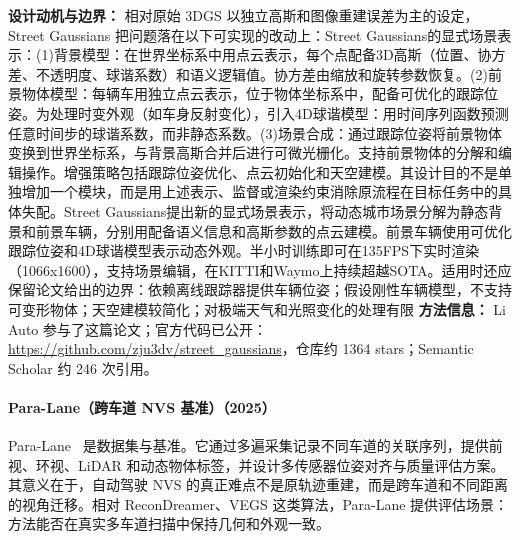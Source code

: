 \textbf{设计动机与边界：} 相对原始 3DGS 以独立高斯和图像重建误差为主的设定，Street Gaussians 把问题落在以下可实现的改动上：Street Gaussians的显式场景表示：(1)背景模型：在世界坐标系中用点云表示，每个点配备3D高斯（位置、协方差、不透明度、球谐系数）和语义逻辑值。协方差由缩放和旋转参数恢复。(2)前景物体模型：每辆车用独立点云表示，位于物体坐标系中，配备可优化的跟踪位姿。为处理时变外观（如车身反射变化），引入4D球谐模型：用时间序列函数预测任意时间步的球谐系数，而非静态系数。(3)场景合成：通过跟踪位姿将前景物体变换到世界坐标系，与背景高斯合并后进行可微光栅化。支持前景物体的分解和编辑操作。增强策略包括跟踪位姿优化、点云初始化和天空建模。其设计目的不是单独增加一个模块，而是用上述表示、监督或渲染约束消除原流程在目标任务中的具体失配。Street Gaussians提出新的显式场景表示，将动态城市场景分解为静态背景和前景车辆，分别用配备语义信息和高斯参数的点云建模。前景车辆使用可优化跟踪位姿和4D球谐模型表示动态外观。半小时训练即可在135FPS下实时渲染（1066x1600），支持场景编辑，在KITTI和Waymo上持续超越SOTA。适用时还应保留论文给出的边界：依赖离线跟踪器提供车辆位姿；假设刚性车辆模型，不支持可变形物体；天空建模较简化；对极端天气和光照变化的处理有限
\textbf{方法信息：} Li Auto 参与了这篇论文；官方代码已公开：\url{https://github.com/zju3dv/street_gaussians}，仓库约 1364 stars；Semantic Scholar 约 246 次引用。



\paragraph{Para-Lane（跨车道 NVS 基准）（2025）}
Para-Lane~\cite{2502_15635} 是数据集与基准。它通过多遍采集记录不同车道的关联序列，提供前视、环视、LiDAR 和动态物体标签，并设计多传感器位姿对齐与质量评估方案。其意义在于，自动驾驶 NVS 的真正难点不是原轨迹重建，而是跨车道和不同距离的视角迁移。相对 ReconDreamer、VEGS 这类算法，Para-Lane 提供评估场景：方法能否在真实多车道扫描中保持几何和外观一致。

